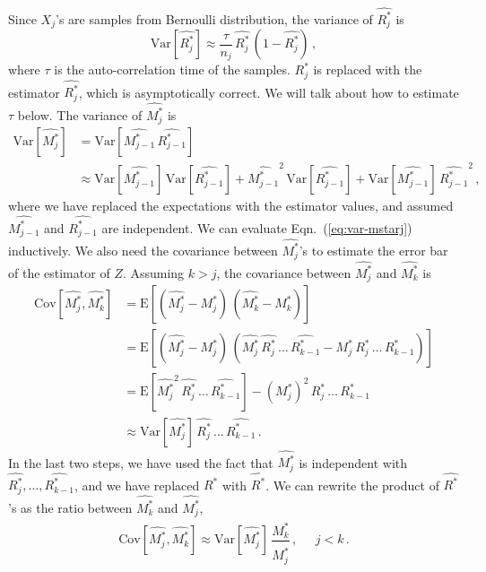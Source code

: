 \documentclass[letterpaper, preprint]{aastex}
\newcommand{\var}{\mathrm{Var}}
\newcommand{\ee}{\mathrm{E}}
\newcommand{\cov}{\mathrm{Cov}}
\begin{document}
Since $X_j$'s are samples from Bernoulli distribution, the variance of $\widehat{R^*_j}$ is
\begin{equation}
\var\left[ \widehat{R^*_j} \right] \approx \frac{\tau}{n_j}\,\widehat{R^*_j}\,(1- \widehat{R^*_j})\, ,
\end{equation}
where $\tau$ is the auto-correlation time of the samples. $R^*_j$ is replaced with the estimator $\widehat{R^*_j}$, which is asymptotically correct. We will talk about how to estimate $\tau$ below. The variance of $\widehat{M^*_j}$ is 
\begin{align}
\var\left[ \widehat{M^*_j} \right] &= \var\left[ \widehat{M^*_{j-1}} \, \widehat{R^*_{j-1}}\right] \nonumber\\
&\approx \var\left[ \widehat{M^*_{j-1}}\right] \, \var\left[ \widehat{R^*_{j-1}}\right] +  \widehat{M^*_{j-1}}^2 \, \var\left[ \widehat{R^*_{j-1}}\right] + \var\left[ \widehat{M^*_{j-1}}\right] \, \widehat{R^*_{j-1}}^2\, ,
\label{eq:var-mstarj}
\end{align}
where we have replaced the expectations with the estimator values, and assumed $\widehat{M^*_{j-1}}$ and $\widehat{R^*_{j-1}}$ are independent. We can evaluate Eqn.~(\ref{eq:var-mstarj}) inductively. We also need the covariance between $\widehat{M^*_j}$'s to estimate the error bar of the estimator of $Z$. Assuming $k > j $, the covariance between $\widehat{M^*_j}$ and $\widehat{M^*_k}$ is
\begin{align}
\cov \left[\widehat{M^*_j} , \widehat{M^*_k} \right] & = \ee \left[  \left( \widehat{M^*_j} - M^*_j \right) \, \left( \widehat{M^*_k} - M^*_k \right) \right] \nonumber \\
& =  \ee \left[  \left( \widehat{M^*_j} - M^*_j \right) \, \left( \widehat{M^*_j}\, \widehat{R^*_j}\,\ldots\, \widehat{R^*_{k-1}} - M^*_j\, R^*_j\,\ldots\, R^*_{k-1}  \right) \right] \nonumber \\
& = \ee \left[ \widehat{M^*_j}^2\, \widehat{R^*_j}\,\ldots\, \widehat{R^*_{k-1}}  \right] - \left(M^*_j\right)^2\, R^*_j\,\ldots\, R^*_{k-1} \nonumber \\
& \approx \var \left[ \widehat{M^*_j} \right] \, \widehat{R^*_j}\,\ldots\, \widehat{R^*_{k-1}}\, .
\end{align}
In the last two steps, we have used the fact that $\widehat{M^*_j}$ is independent with $\widehat{R^*_j},\ldots, \widehat{R^*_{k-1}}$, and we have replaced $R^*$ with $\widehat{R^*}$. We can rewrite the product of $\widehat{R^*}$'s as the ratio between $\widehat{M^*_k}$ and $\widehat{M^*_j}$,
\begin{equation}
\cov\left[\widehat{M^*_j} , \widehat{M^*_k} \right] \approx \var \left[ \widehat{M^*_j} \right] \, \frac{\widehat{M^*_k}}{\widehat{M^*_j}}\, , \;\;\;\;\; j < k\, .
\label{eq:cov-mstarij}
\end{equation}
\end{document}
